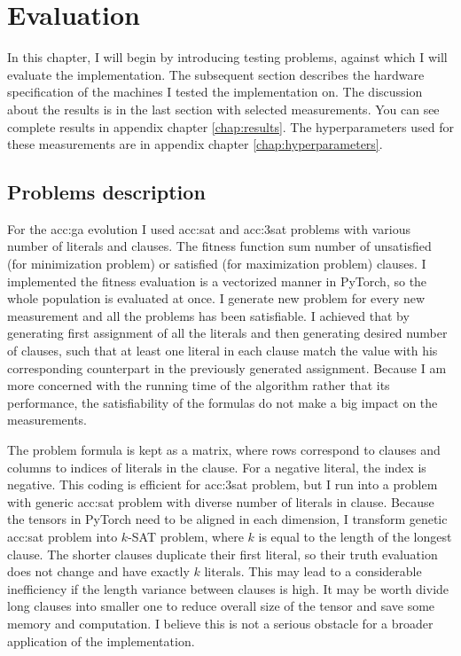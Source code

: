 \chapter{Evaluation}

In this chapter, I will begin by introducing testing problems, against which I will evaluate the implementation. The subsequent section describes the hardware specification of the machines I tested the implementation on. The discussion about the results is in the last section with selected measurements. You can see complete results in appendix chapter \ref{chap:results}. The hyperparameters used for these measurements are in appendix chapter \ref{chap:hyperparameters}.




\section{Problems description}

For the \acrlong{acc:ga} evolution I used \acrshort{acc:sat} and \acrshort{acc:3sat} problems with various number of literals and clauses. The fitness function sum number of unsatisfied (for minimization problem) or satisfied (for maximization problem) clauses. I implemented the fitness evaluation is a vectorized manner in PyTorch, so the whole population is evaluated at once. I generate new problem for every new measurement and all the problems has been satisfiable. I achieved that by generating first assignment of all the literals and then generating desired number of clauses, such that at least one literal in each clause match the value with his corresponding counterpart in the previously generated assignment. Because I am more concerned with the running time of the algorithm rather that its performance, the satisfiability of the formulas do not make a big impact on the measurements.

The problem formula is kept as a matrix, where rows correspond to clauses and columns to indices of literals in the clause. For a negative literal, the index is negative. This coding is efficient for \acrshort{acc:3sat} problem, but I run into a problem with generic \acrshort{acc:sat} problem with diverse number of literals in clause. Because the tensors in PyTorch need to be aligned in each dimension, I transform genetic \acrshort{acc:sat} problem into $k$-SAT problem, where $k$ is equal to the length of the longest clause. The shorter clauses duplicate their first literal, so their truth evaluation does not change and have exactly $k$ literals. This may lead to a considerable inefficiency if the length variance between clauses is high. It may be worth divide long clauses into smaller one to reduce overall size of the tensor and save some memory and computation. I believe this is not a serious obstacle for a broader application of the implementation.

